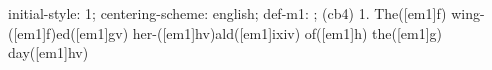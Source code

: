 initial-style: 1;
centering-scheme: english;
def-m1: \grealign;
(cb4) 1. The([em1]f) wing-([em1]f)ed([em1]gv) her-([em1]hv)ald([em1]ixiv) of([em1]h) the([em1]g) day([em1]hv)